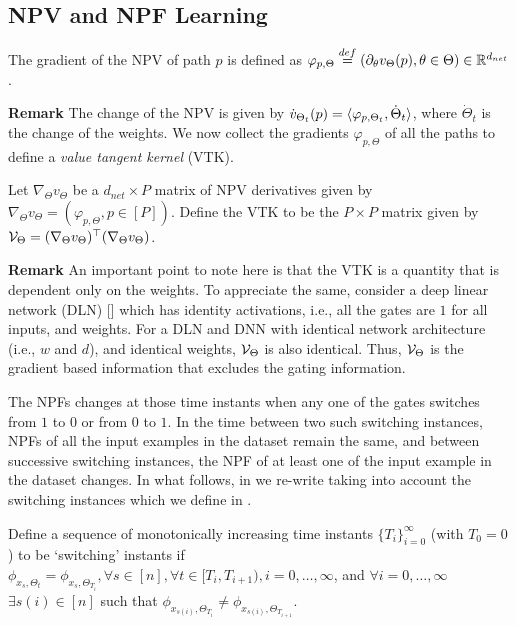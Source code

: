 \subsection{NPV and NPF Learning}
\begin{definition}\label{def:npvgrad}
The gradient of the NPV of path $p$ is defined as $\varphi_{p,\Theta}\stackrel{def}=(\partial_{\theta}v_{\Theta}(p), \theta \in\Theta)\in\mathbb{R}^{d_{net}}$.
\end{definition}
\textbf{Remark} The change of the NPV is given by $\dot{v}_{\Theta_t}(p)=\langle \varphi_{p,\Theta_t},\dot{\Theta}_t\rangle$, where $\dot{\Theta}_t$ is the change of the weights. We now collect the gradients $\varphi_{p,\Theta}$ of all the paths to define a \emph{value tangent kernel} (VTK). 
\begin{definition}
Let $\nabla_{\Theta}v_{\Theta}$ be a $d_{net}\times P$ matrix of NPV derivatives given by $\nabla_{\Theta}v_{\Theta}=(\varphi_{p,\Theta},p\in[P])$. Define the VTK to be the $P\times P$ matrix given by $\mathcal{V}_{\Theta}=(\nabla_{\Theta}v_{\Theta})^\top(\nabla_{\Theta}v_{\Theta})$.
\end{definition}
\textbf{Remark} An important point to note here is that the VTK is a quantity that is dependent only on the weights. To appreciate the same, consider a deep linear network (DLN) [] which has identity activations, i.e., all the gates are $1$ for all inputs, and weights. For a DLN and DNN with identical network architecture (i.e., $w$ and $d$), and identical weights, $\mathcal{V}_{\Theta}$ is also identical. Thus, $\mathcal{V}_{\Theta}$ is the gradient based information that excludes the gating information.

The NPFs changes at those time instants when any one of the gates switches from $1$ to $0$ or from $0$ to $1$. In the time between two such switching instances, NPFs of all the input examples in the dataset remain the same, and between successive switching instances,  the NPF of at least one of the input example in the dataset changes. In what follows, in  we re-write  taking into account the switching instances which we define in .
\begin{definition}\label{def:switch}
Define a sequence of monotonically increasing time instants $\{T_{i}\}_{i=0}^\infty$ (with $T_0=0$) to be `switching' instants if $\phi_{x_s,\Theta_t}=\phi_{x_s,\Theta_{T_i}},\forall s\in[n],\forall t\in[T_{i},T_{i+1}), i=0,\ldots,\infty$, and  $\forall i=0,\ldots, \infty$ $\exists s(i)\in[n]$ such that $\phi_{x_{s(i)},\Theta_{T_i}}\neq \phi_{x_{s(i)},\Theta_{T_{i+1}}}$.
\end{definition}
